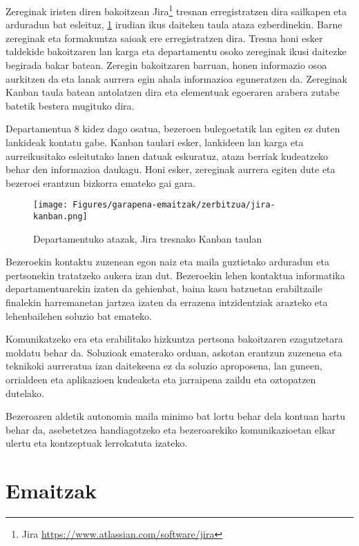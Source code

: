 Zereginak iristen diren bakoitzean Jira\footnote{Jira \url{https://www.atlassian.com/software/jira}} tresnan erregistratzen dira sailkapen eta arduradun bat esleituz, \ref{jira} irudian ikus daiteken taula ataza ezberdinekin. Barne zereginak eta formakuntza saioak ere erregistratzen dira. Tresna honi esker taldekide bakoitzaren lan karga eta departamentu osoko zereginak ikusi daitezke begirada bakar batean. Zeregin bakoitzaren barruan, honen informazio osoa aurkitzen da eta lanak aurrera egin ahala informazioa eguneratzen da. Zereginak Kanban taula batean antolatzen dira eta elementuak egoeraren arabera zutabe batetik bestera mugituko dira. 

Departamentua 8 kidez dago osatua, bezeroen bulegoetatik lan egiten ez duten lankideak kontatu gabe. Kanban taulari esker, lankideen lan karga eta aurreikusitako esleitutako lanen datuak eskuratuz, ataza berriak kudeatzeko behar den informazioa daukagu. Honi esker, zereginak aurrera egiten dute eta bezeroei erantzun bizkorra emateko gai gara. 

\begin{figure}[H]
\vspace{0.35cm}
\centering
\texttt{[image: Figures/garapena-emaitzak/zerbitzua/jira-kanban.png]}
\caption{Departamentuko atazak, Jira tresnako Kanban taulan}
\label{jira}
\end{figure}

Bezeroekin kontaktu zuzenean egon naiz eta maila guztietako arduradun eta pertsonekin tratatzeko aukera izan dut. Bezeroekin lehen kontaktua informatika departamentuarekin izaten da gehienbat, baina kasu batzuetan erabiltzaile finalekin harremanetan jartzea izaten da errazena intzidentziak arazteko eta lehenbailehen soluzio bat emateko.

Komunikatzeko era eta erabilitako hizkuntza pertsona bakoitzaren ezagutzetara moldatu behar da. Soluzioak ematerako orduan, askotan erantzun zuzenena eta teknikoki aurreratua izan daitekeena ez da soluzio aproposena, lan guneen, orrialdeen eta aplikazioen kudeaketa eta jarraipena zaildu eta oztopatzen dutelako.

Bezeroaren aldetik autonomia maila minimo bat lortu behar dela kontuan hartu behar da, asebetetzea handiagotzeko eta bezeroarekiko komunikazioetan elkar ulertu eta kontzeptuak lerrokatuta izateko. 

\section{Emaitzak}\label{sec:emaitzak}

